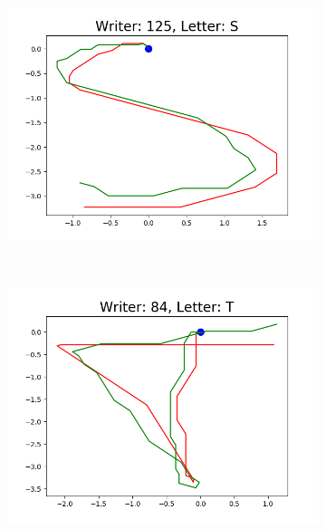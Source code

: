 \begin{figure}
\begin{subfigure}[b]{0.17\textwidth}
          \includegraphics[width=\textwidth]{images/framework/comparison_figures/S_125.png}
      \end{subfigure}
      ~
      \begin{subfigure}[b]{0.17\textwidth}
          \includegraphics[width=\textwidth]{images/framework/comparison_figures/T_84.png}
      \end{subfigure}
      ~
      \begin{subfigure}[b]{0.17\textwidth}

\end{subfigure}
\end{figure}
